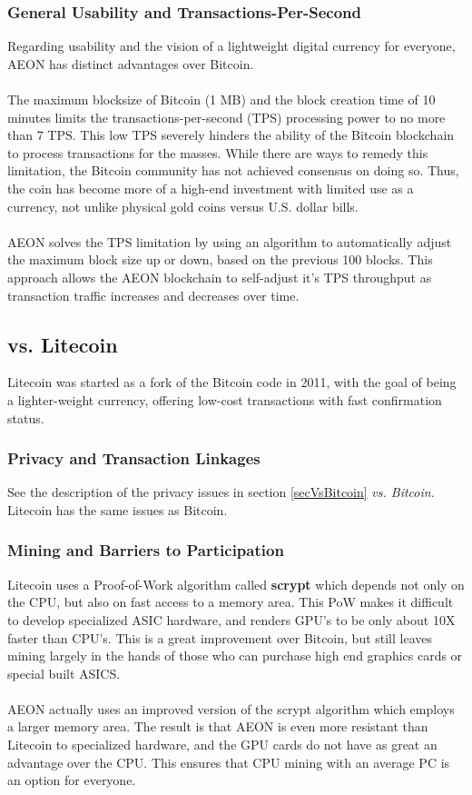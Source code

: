 \subsubsection{General Usability and Transactions-Per-Second}
Regarding usability and the vision of a lightweight digital currency for everyone, AEON has distinct advantages over Bitcoin.\\
\\
The maximum blocksize of Bitcoin (1 MB) and the block creation time of 10 minutes limits the transactions-per-second (TPS) processing power to no more than 7 TPS.  This low TPS severely hinders the ability of the Bitcoin blockchain to process transactions for the masses.  While there are ways to remedy this limitation, the Bitcoin community has not achieved consensus on doing so.  Thus, the coin has become more of a high-end investment with limited use as a currency, not unlike physical gold coins versus U.S. dollar bills.\\
\\
AEON solves the TPS limitation by using an algorithm to automatically adjust the maximum block size up or down, based on the previous 100 blocks. This approach allows the AEON blockchain to self-adjust it's TPS throughput as transaction traffic increases and decreases over time.

\subsection{vs. Litecoin}
Litecoin was started as a fork of the Bitcoin code in 2011, with the goal of being a lighter-weight currency, offering low-cost transactions with fast confirmation status.

\subsubsection{Privacy and Transaction Linkages}
See the description of the privacy issues in section \ref{secVsBitcoin} \textit{vs. Bitcoin}. Litecoin has the same issues as Bitcoin.

\subsubsection{Mining and Barriers to Participation}
Litecoin uses a Proof-of-Work algorithm called \textbf{scrypt} which depends not only on the CPU, but also on fast access to a memory area.  This PoW makes it difficult to develop specialized ASIC hardware, and renders GPU's to be only about 10X faster than CPU's.  This is a great improvement over Bitcoin, but still leaves mining largely in the hands of those who can purchase high end graphics cards or special built ASICS.\\
\\
AEON actually uses an improved version of the scrypt algorithm which employs a larger memory area. The result is that AEON is even more resistant than Litecoin to specialized hardware, and the GPU cards do not have as great an advantage over the CPU.  This ensures that CPU mining with an average PC is an option for everyone.

